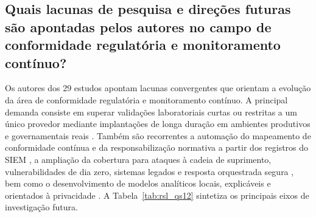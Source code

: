 \subsection{Quais lacunas de pesquisa e direções futuras são apontadas pelos autores no campo de conformidade regulatória e monitoramento contínuo?}
\label{subsec:rsl_qs12}

Os autores dos 29 estudos apontam lacunas convergentes que orientam a evolução da área de conformidade regulatória e monitoramento contínuo. A principal demanda consiste em superar validações laboratoriais curtas ou restritas a um único provedor mediante implantações de longa duração em ambientes produtivos e governamentais reais \cite{gajra2025,joshisabhaya2026,acosta2025,shao2026b,mahida2026}. Também são recorrentes a automação do mapeamento de conformidade contínua e da responsabilização normativa a partir dos registros do SIEM \cite{torkura2021,giulio2017,velasquez2025,enaw2018}, a ampliação da cobertura para ataques à cadeia de suprimento, vulnerabilidades de dia zero, sistemas legados e resposta orquestrada segura \cite{joshisegireddy2026,upadhyaya2025,setiawan2025,kalafatidis2025}, bem como o desenvolvimento de modelos analíticos locais, explicáveis e orientados à privacidade \cite{devarajulu2025,kalafatidis2025,portillo2019}. A Tabela~\ref{tab:rsl_qs12} sintetiza os principais eixos de investigação futura.

